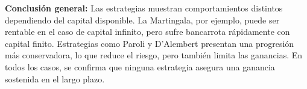 \documentclass{article}
\begin{document}
\vspace{0.5cm}

\textbf{Conclusión general:} Las estrategias muestran comportamientos distintos dependiendo del capital disponible. La Martingala, por ejemplo, puede ser rentable en el caso de capital infinito, pero sufre bancarrota rápidamente con capital finito. Estrategias como Paroli y D’Alembert presentan una progresión más conservadora, lo que reduce el riesgo, pero también limita las ganancias. En todos los casos, se confirma que ninguna estrategia asegura una ganancia sostenida en el largo plazo.
\end{document}
